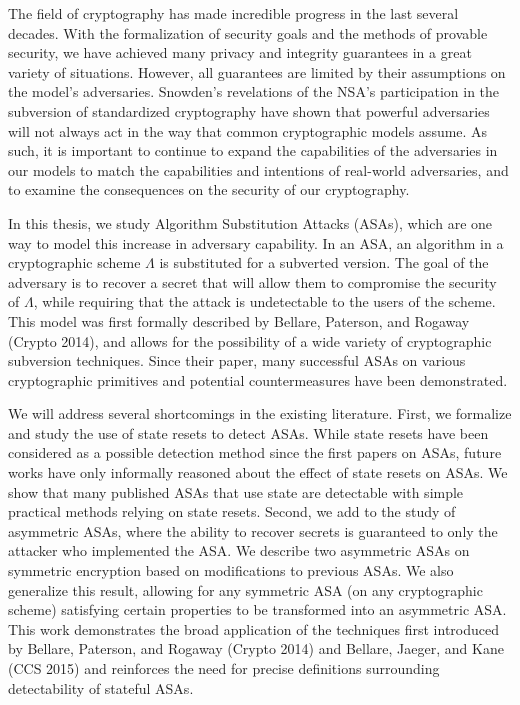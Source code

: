 The field of cryptography has made incredible progress in the last several decades. With the formalization of security goals and the methods of provable security, we have achieved many privacy and integrity guarantees in a great variety of situations. However, all guarantees are limited by their assumptions on the model's adversaries. Snowden's revelations of the NSA's participation in the subversion of standardized cryptography have shown that powerful adversaries will not always act in the way that common cryptographic models assume. As such, it is important to continue to expand the capabilities of the adversaries in our models to match the capabilities and intentions of real-world adversaries, and to examine the consequences on the security of our cryptography.

In this thesis, we study Algorithm Substitution Attacks (ASAs), which are one way to model this increase in adversary capability. In an ASA, an algorithm in a cryptographic scheme $\Lambda$ is substituted for a subverted version. The goal of the adversary is to recover a secret that will allow them to compromise the security of $\Lambda$, while requiring that the attack is undetectable to the users of the scheme. This model was first formally described by Bellare, Paterson, and Rogaway (Crypto 2014), and allows for the possibility of a wide variety of cryptographic subversion techniques. Since their paper, many successful ASAs on various cryptographic primitives and potential countermeasures have been demonstrated.

We will address several shortcomings in the existing literature. First, we formalize and study the use of state resets to detect ASAs. While state resets have been considered as a possible detection method since the first papers on ASAs, future works have only informally reasoned about the effect of state resets on ASAs. We show that many published ASAs that use state are detectable with simple practical methods relying on state resets. Second, we add to the study of asymmetric ASAs, where the ability to recover secrets is guaranteed to only the attacker who implemented the ASA. We describe two asymmetric ASAs on symmetric encryption based on modifications to previous ASAs. We also generalize this result, allowing for any symmetric ASA (on any cryptographic scheme) satisfying certain properties to be transformed into an asymmetric ASA. This work demonstrates the broad application of the techniques first introduced by Bellare, Paterson, and Rogaway (Crypto 2014) and Bellare, Jaeger, and Kane (CCS 2015) and reinforces the need for precise definitions surrounding detectability of stateful ASAs.
